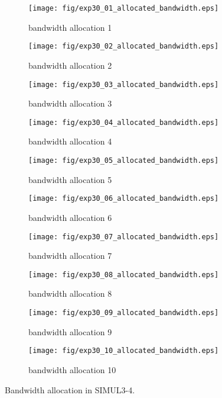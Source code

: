 	\begin{figure}
		\begin{center}
			\begin{subfigure}[b]{0.32\textwidth}
				\texttt{[image: fig/exp30\_01\_allocated\_bandwidth.eps]}
				\caption{bandwidth allocation 1}
				\label{figure:simul3_4_b_a}
			\end{subfigure}
			\begin{subfigure}[b]{0.32\textwidth}
				\texttt{[image: fig/exp30\_02\_allocated\_bandwidth.eps]}
				\caption{bandwidth allocation 2}
				\label{figure:simul3_4_b_b}
			\end{subfigure}
			\begin{subfigure}[b]{0.32\textwidth}
				\texttt{[image: fig/exp30\_03\_allocated\_bandwidth.eps]}
				\caption{bandwidth allocation 3}
				\label{figure:simul3_4_b_c}
			\end{subfigure}
			\begin{subfigure}[b]{0.32\textwidth}
				\texttt{[image: fig/exp30\_04\_allocated\_bandwidth.eps]}
				\caption{bandwidth allocation 4}
				\label{figure:simul3_4_b_d}
			\end{subfigure}
			\begin{subfigure}[b]{0.32\textwidth}
				\texttt{[image: fig/exp30\_05\_allocated\_bandwidth.eps]}
				\caption{bandwidth allocation 5}
				\label{figure:simul3_4_b_e}
			\end{subfigure}
			\begin{subfigure}[b]{0.32\textwidth}
				\texttt{[image: fig/exp30\_06\_allocated\_bandwidth.eps]}
				\caption{bandwidth allocation 6}
				\label{figure:simul3_4_b_f}
			\end{subfigure}
			\begin{subfigure}[b]{0.32\textwidth}
				\texttt{[image: fig/exp30\_07\_allocated\_bandwidth.eps]}
				\caption{bandwidth allocation 7}
				\label{figure:simul3_4_b_g}
			\end{subfigure}
			\begin{subfigure}[b]{0.32\textwidth}
				\texttt{[image: fig/exp30\_08\_allocated\_bandwidth.eps]}
				\caption{bandwidth allocation 8}
				\label{figure:simul3_4_b_h}
			\end{subfigure}
			\begin{subfigure}[b]{0.32\textwidth}
				\texttt{[image: fig/exp30\_09\_allocated\_bandwidth.eps]}
				\caption{bandwidth allocation 9}
				\label{figure:simul3_4_b_i}
			\end{subfigure}
			\begin{subfigure}[b]{0.32\textwidth}
				\texttt{[image: fig/exp30\_10\_allocated\_bandwidth.eps]}
				\caption{bandwidth allocation 10}
				\label{figure:simul3_4_b_j}
			\end{subfigure}
			\caption{Bandwidth allocation in SIMUL3-4.}
			\label{figure:simul3_4_ba}
		\end{center}
	\end{figure}


